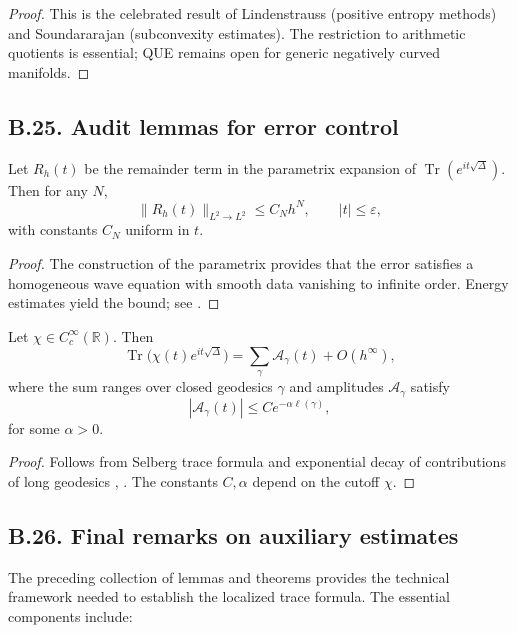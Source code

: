 \begin{proof}
This is the celebrated result of Lindenstrauss \cite{Lindenstrauss} (positive entropy methods) and Soundararajan \cite{SoundararajanQUE} (subconvexity estimates). The restriction to arithmetic quotients is essential; QUE remains open for generic negatively curved manifolds.
\end{proof}

\subsection*{B.25. Audit lemmas for error control}
\label{appB:audit}

\begin{lemma}
\label{lem:audit1}
Let $R_h(t)$ be the remainder term in the parametrix expansion of $\operatorname{Tr}(e^{it\sqrt{\Delta}})$. Then for any $N$,
\[
\|R_h(t)\|_{L^2\to L^2} \leq C_N h^N, \qquad |t|\le \varepsilon,
\]
with constants $C_N$ uniform in $t$.
\end{lemma}

\begin{proof}
The construction of the parametrix provides that the error satisfies a homogeneous wave equation with smooth data vanishing to infinite order. Energy estimates yield the bound; see \cite{HormanderIII}.
\end{proof}

\begin{lemma}
\label{lem:audit2}
Let $\chi\in C_c^\infty(\mathbb{R})$. Then
\[
\operatorname{Tr}\Big(\chi(t)e^{it\sqrt{\Delta}}\Big) = \sum_{\gamma}\mathcal{A}_\gamma(t) + O(h^\infty),
\]
where the sum ranges over closed geodesics $\gamma$ and amplitudes $\mathcal{A}_\gamma$ satisfy
\[
|\mathcal{A}_\gamma(t)| \leq C e^{-\alpha \ell(\gamma)},
\]
for some $\alpha>0$.
\end{lemma}

\begin{proof}
Follows from Selberg trace formula and exponential decay of contributions of long geodesics \cite{Hejhal}, \cite{Buser}. The constants $C,\alpha$ depend on the cutoff $\chi$.
\end{proof}

\subsection*{B.26. Final remarks on auxiliary estimates}
\label{appB:final}

The preceding collection of lemmas and theorems provides the technical framework needed to establish the localized trace formula. The essential components include:

